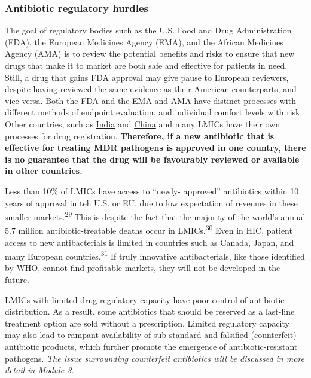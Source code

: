 \documentclass[
  11pt,
  paper=a4,
  ,captions=tableheading
]{scrartcl}
\begin{document}
\hypertarget{antibiotic-regulatory-hurdles}{%
\subsubsection*{Antibiotic regulatory
hurdles}\label{antibiotic-regulatory-hurdles}}

The goal of regulatory bodies such as the U.S. Food and Drug
Administration (FDA), the European Medicines Agency (EMA), and the
African Medicines Agency (AMA) is to review the potential benefits and
risks to ensure that new drugs that make it to market are both safe and
effective for patients in need. Still, a drug that gains FDA approval
may give pause to European reviewers, despite having reviewed the same
evidence as their American counterparts, and vice versa. Both the
\href{https://www.fda.gov/media/82381/download}{FDA} and the
\href{https://www.ema.europa.eu/en/documents/other/laboratory-patient-journey-centrally-authorised-medicine_en.pdf}{EMA}
and
\href{https://www.ifpma.org/subtopics/african-medicines-agency/}{AMA}
have distinct processes with different methods of endpoint evaluation,
and individual comfort levels with risk. Other countries, such as
\href{https://cdsco.gov.in/opencms/opencms/en/Drugs/New-Drugs/}{India}
and
\href{https://www.appliedclinicaltrialsonline.com/view/regulatory-requirements-and-key-points-drug-clinical-trials-registration-china}{China}
and many LMICs have their own processes for drug registration.
\textbf{Therefore, if a new antibiotic that is effective for treating
MDR pathogens is approved in one country, there is no guarantee that the
drug will be favourably reviewed or available in other countries.}

Less than 10\% of LMICs have access to ``newly- approved'' antibiotics
within 10 years of approval in teh U.S. or EU, due to low expectation of
revenues in these smaller markets.\textsuperscript{29} This is despite
the fact that the majority of the world's annual 5.7 million
antibiotic-treatable deaths occur in LMICs.\textsuperscript{30} Even in
HIC, patient access to new antibacterials is limited in countries such
as Canada, Japan, and many European countries.\textsuperscript{31} If
truly innovative antibacterials, like those identified by WHO, cannot
find profitable markets, they will not be developed in the future.

LMICs with limited drug regulatory capacity have poor control of
antibiotic distribution. As a result, some antibiotics that should be
reserved as a last-line treatment option are sold without a
prescription. Limited regulatory capacity may also lead to rampant
availability of sub-standard and falsified (counterfeit) antibiotic
products, which further promote the emergence of antibiotic-resistant
pathogens. \emph{The issue surrounding counterfeit antibiotics will be
discussed in more detail in Module 3.}
\end{document}
